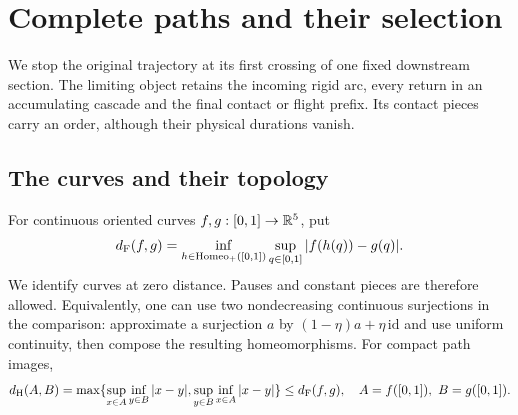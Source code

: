 \section{Complete paths and their selection}
\label{sec:main-results}

We stop the original trajectory at its first crossing of one fixed
downstream section. The limiting object retains the incoming rigid
arc, every return in an accumulating cascade and the final contact
or flight prefix. Its contact pieces carry an order, although their
physical durations vanish.

\subsection{The curves and their topology}
For continuous oriented curves $f,g:[0,1]\to\mathbb R^5$, put
\begin{equation}
 d_{\mathrm F}(f,g)=\inf_{h\in\mathrm{Homeo}_+([0,1])}
                 \sup_{q\in[0,1]}|f(h(q))-g(q)|.
 \label{eq:ps5-frechet}
\end{equation}
We identify curves at zero distance. Pauses and constant pieces are
therefore allowed. Equivalently, one can use two nondecreasing
continuous surjections in the comparison: approximate a surjection
$a$ by $(1-\eta)a+\eta\,\mathrm{id}$ and use uniform continuity,
then compose the resulting homeomorphisms. For compact path images,
\begin{equation}
 d_{\mathrm H}(A,B)=\max\{\sup_{x\in A}\inf_{y\in B}|x-y|,
                    \sup_{y\in B}\inf_{x\in A}|x-y|\}
 \le d_{\mathrm F}(f,g),\quad A=f([0,1]),\ B=g([0,1]).
 \label{eq:ps5-hausdorff}
\end{equation}

